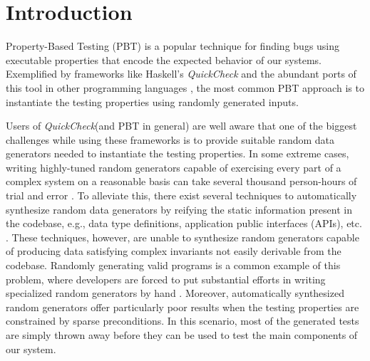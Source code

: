 \documentclass[sigconf, anonymous]{acmart}
\newcommand{\quickcheck}{\textit{QuickCheck}\xspace}
\begin{document}


\maketitle



\section{Introduction}
\label{sec:intro}

%
Property-Based Testing (PBT) is a popular technique for finding bugs using
executable properties that encode the expected behavior of our systems.
%
Exemplified by frameworks like Haskell's \quickcheck \cite{ClaessenH00} and the
abundant ports of this tool in other programming languages
\cite{hughes2003erlang, papadakis2011proper, bulwahn2012new,
  denes2014quickchick}, the most common PBT approach is to instantiate the
testing properties using randomly generated inputs.


Users of \quickcheck (and PBT in general) are well aware that one of the biggest
challenges while using these frameworks is to provide suitable random data
generators needed to instantiate the testing properties.
%
In some extreme cases, writing highly-tuned random generators capable of
exercising every part of a complex system on a reasonable basis can take several
thousand person-hours of trial and error \cite{lampropoulos2019coverage}.
%
To alleviate this, there exist several techniques to automatically synthesize
random data generators by reifying the static information present in the
codebase, e.g., data type definitions, application public interfaces (APIs),
etc. \cite{GriecoCB16, DBLP:conf/haskell/MistaRH18, Mista2019GeneratingRS,
  DuregardJW12, Lampropoulos2017, Bendkowski2017}.
%
These techniques, however, are unable to synthesize random generators capable of
producing data satisfying complex invariants not easily derivable from the
codebase.
%
Randomly generating valid programs is a common example of this problem, where
developers are forced to put substantial efforts in writing specialized random
generators by hand \cite{Palka11, perenyi2020stack, yang2011finding}.
%
Moreover, automatically synthesized random generators offer particularly poor
results when the testing properties are constrained by sparse preconditions.
%
In this scenario, most of the generated tests are simply thrown away before they
can be used to test the main components of our system.
\end{document}
